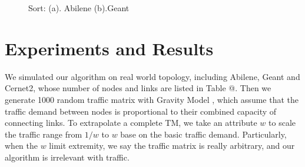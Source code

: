 \documentclass[conference]{IEEEtran}
\makeatletter
\newcommand{\Rmnum}[1]{\expandafter\@slowromancap\romannumeral #1@}
\makeatother
\begin{document}
\begin{figure}[!t]
\centering
\vspace*{0.1in}
\caption{Sort: (a). Abilene (b).Geant}
\vspace*{0.1in}
\end{figure}


\section{Experiments and Results}
We simulated our algorithm on real world topology, including Abilene, Geant and Cernet2, whose number of nodes and links are listed in Table \Rmnum{1}.
Then we generate 1000 random traffic matrix with Gravity Model \cite{networking:gravity}, which assume that the traffic demand between nodes is proportional
to their combined capacity of connecting links. To extrapolate a complete TM, we take an attribute $w$ to scale the traffic range from $1/w$ to $w$
base on the basic traffic demand. Particularly, when the $w$ limit extremity, we say the traffic matrix is really arbitrary, and our 
algorithm is irrelevant with traffic.
\end{document}
